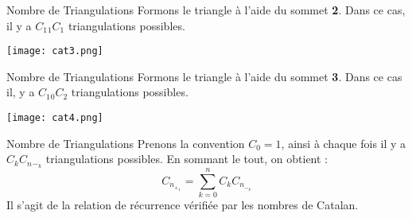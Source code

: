 \documentclass{beamer}
\begin{document}
    \begin{frame}{Nombre de Triangulations}
        Formons le triangle à l'aide du sommet \textbf{2}. \newline
        Dans ce cas, il y a $C_1{}_1C_1$ triangulations possibles.
        \begin{center}
            \texttt{[image: cat3.png]}
        \end{center}
    \end{frame}
     \begin{frame}{Nombre de Triangulations}
        Formons le triangle à l'aide du sommet \textbf{3}. \newline
        Dans ce cas il, y a $C_1{}_0C_2$ triangulations possibles.
        \begin{center}
            \texttt{[image: cat4.png]}
        \end{center}
    \end{frame}
    \begin{frame}{Nombre de Triangulations}
        Prenons la convention $C_0=1$, ainsi à chaque fois il y a $C_kC_n{}_-_k$ triangulations possibles. En sommant le tout, on obtient : \newline\newline
        \begin{equation}
            C_n_+_1 = \displaystyle  \sum_{k=0}^{n}C_kC_n_-_k
        \end{equation}
        \newline\newline
        Il s'agit de la relation de récurrence vérifiée par les nombres de Catalan.
    \end{frame}
\end{document}
